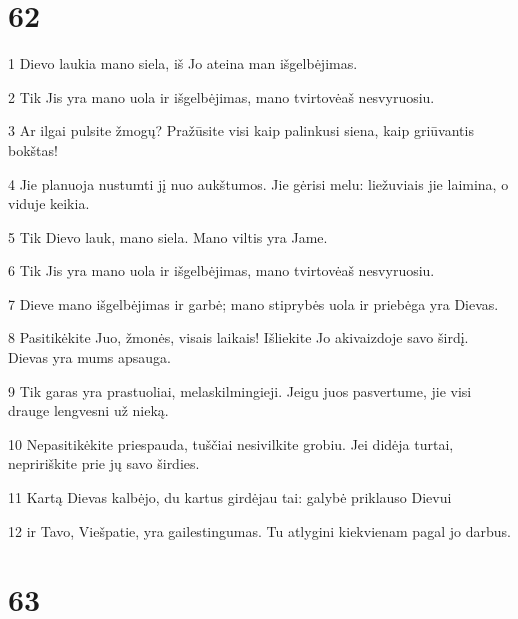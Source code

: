 \chapter{62}


\par 1 Dievo laukia mano siela, iš Jo ateina man išgelbėjimas. 
\par 2 Tik Jis yra mano uola ir išgelbėjimas, mano tvirtovė­aš nesvyruosiu. 
\par 3 Ar ilgai pulsite žmogų? Pražūsite visi kaip palinkusi siena, kaip griūvantis bokštas! 
\par 4 Jie planuoja nustumti jį nuo aukštumos. Jie gėrisi melu: liežuviais jie laimina, o viduje keikia. 
\par 5 Tik Dievo lauk, mano siela. Mano viltis yra Jame. 
\par 6 Tik Jis yra mano uola ir išgelbėjimas, mano tvirtovė­aš nesvyruosiu. 
\par 7 Dieve mano išgelbėjimas ir garbė; mano stiprybės uola ir priebėga yra Dievas. 
\par 8 Pasitikėkite Juo, žmonės, visais laikais! Išliekite Jo akivaizdoje savo širdį. Dievas yra mums apsauga. 
\par 9 Tik garas yra prastuoliai, melas­kilmingieji. Jeigu juos pasvertume, jie visi drauge lengvesni už nieką. 
\par 10 Nepasitikėkite priespauda, tuščiai nesivilkite grobiu. Jei didėja turtai, nepririškite prie jų savo širdies. 
\par 11 Kartą Dievas kalbėjo, du kartus girdėjau tai: galybė priklauso Dievui 
\par 12 ir Tavo, Viešpatie, yra gailestingumas. Tu atlygini kiekvienam pagal jo darbus.



\chapter{63}


